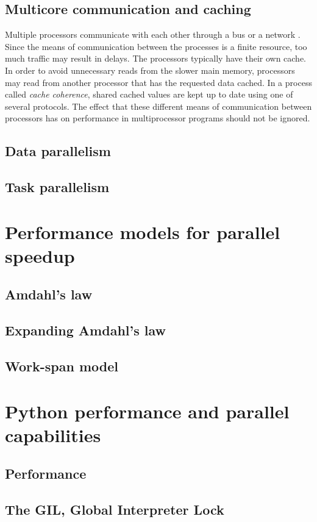 \subsection{Multicore communication and caching}
Multiple processors communicate with each other through a bus or a network \cite[Appendix B]{herlihy_2012_art_taomprr}. Since the
means of communication between the processes is a finite resource, too much traffic may result in delays. The processors typically
have their own cache. In order to avoid unnecessary reads from the slower main memory, processors may read from another processor
that has the requested data cached. In a process called \emph{cache coherence}, shared cached values are kept up to date using one
of several protocols. The effect that these different means of communication between processors has on performance in
multiprocessor programs should not be ignored.

\subsection{Data parallelism}
\subsection{Task parallelism}
\section{Performance models for parallel speedup}
\subsection{Amdahl's law}
\subsection{Expanding Amdahl's law}
\subsection{Work-span model}
\section{Python performance and parallel capabilities}
\subsection{Performance}
\subsection{The GIL, Global Interpreter Lock}
